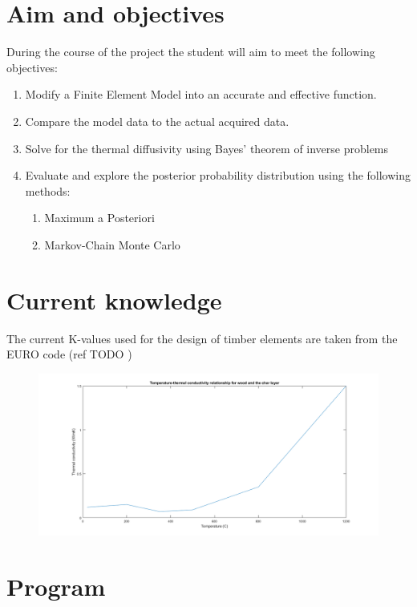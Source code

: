\section{Aim and objectives}
During the course of the project the student will aim to meet the following objectives:
\begin{enumerate}
 \item Modify a Finite Element Model into an accurate and effective function.
 \item Compare the model data to the actual acquired data.
 \item Solve for the thermal diffusivity using Bayes' theorem of inverse problems
 \item Evaluate and explore the posterior probability distribution using the following methods:
 	\begin{enumerate}
 		\item Maximum a Posteriori
 		\item Markov-Chain Monte Carlo 	
 	\end{enumerate}
\end{enumerate}

\section{Current knowledge}
	
	
	The current K-values used for the design of timber elements are taken from the EURO code (ref TODO \citep{Euro:2004})  
	\begin{figure}[H]
	\label{kvalue_fig}
	\centering
	\includegraphics[width = \linewidth]{figures/kvalues_euro.png}
	\end{figure}
	

	
\section{Program}